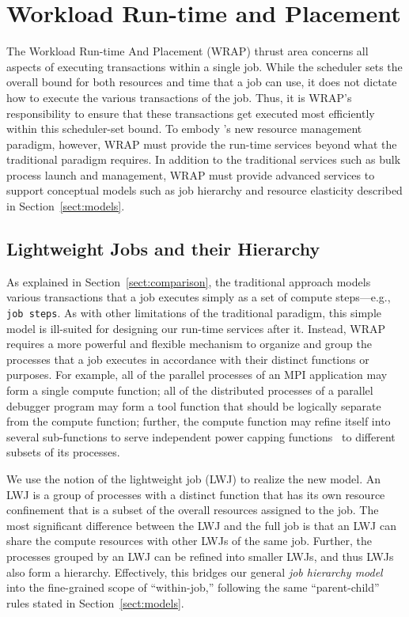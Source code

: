 \section{Workload Run-time and Placement} 
\label{sect:WRAP}

\ifcomments
{}
\fi
The Workload Run-time And Placement (WRAP) thrust area concerns all aspects of
executing transactions within a single job. 
While the scheduler sets the overall bound for both resources and time that a job 
can use, it does not dictate how to execute the various transactions of the job.
Thus, it is WRAP's responsibility to ensure that these transactions get executed 
most efficiently within this scheduler-set bound.
To embody \ngrm's new resource management paradigm, however, WRAP must provide the run-time
services beyond what the traditional paradigm requires. 
In addition to the traditional services such as bulk process launch and 
management, WRAP must provide advanced services to 
support conceptual models such as job hierarchy and resource elasticity 
described in Section~\ref{sect:models}.

\subsection{Lightweight Jobs and their Hierarchy}

As explained in Section~\ref{sect:comparison}, the traditional
approach models various transactions that a job executes simply as a set of
compute steps---e.g., {\tt job steps}.
As with other limitations of the traditional paradigm, this simple model
is ill-suited for designing our run-time services after it. 
Instead, WRAP requires a more powerful and flexible mechanism
to organize and group the processes that a job executes 
in accordance with their distinct functions or purposes. 
For example, all of the parallel processes of an MPI application may form a single 
compute function; all of the distributed processes of a parallel
debugger program may form a tool function that should be logically separate from 
the compute function; further, the compute function
may refine itself into several sub-functions to serve
independent power capping functions~\cite{RountreeRAPL} to different subsets of its processes.  

We use the notion of the lightweight job (LWJ) to realize the new model. 
An LWJ is a group of processes with a distinct function 
that has its own resource confinement that is a subset of 
the overall resources assigned to the job.
The most significant difference between the LWJ and the full job is that an LWJ
can share the compute resources with other LWJs of the same job. 
Further, the processes grouped by an LWJ can be refined into smaller LWJs,
and thus LWJs also form a hierarchy. Effectively, this bridges 
our general {\em job hierarchy model} into the fine-grained 
scope of ``within-job,'' following the same ``parent-child'' rules stated
in Section~\ref{sect:models}.

